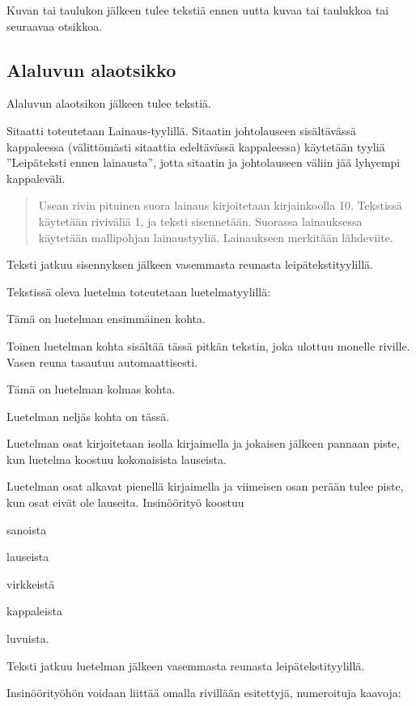 Kuvan tai taulukon jälkeen tulee tekstiä ennen uutta kuvaa tai taulukkoa tai seuraavaa otsikkoa.

\subsection{Alaluvun alaotsikko}

Alaluvun alaotsikon jälkeen tulee tekstiä.

Sitaatti toteutetaan Lainaus-tyylillä. Sitaatin johtolauseen sisältävässä kappaleessa (välittömästi sitaattia edeltävässä kappaleessa) käytetään tyyliä ”Leipäteksti ennen lainausta”, jotta sitaatin ja johtolauseen väliin jää lyhyempi kappaleväli.

\begin{quote}
Usean rivin pituinen suora lainaus kirjoitetaan kirjainkoolla 10. Tekstissä käytetään riviväliä 1, ja teksti sisennetään. Suorassa lainauksessa käytetään mallipohjan lainaustyyliä. Lainaukseen merkitään lähdeviite.
\end{quote}

Teksti jatkuu sisennyksen jälkeen vasemmasta reunasta leipätekstityylillä.

Tekstissä oleva luetelma toteutetaan luetelmatyylillä:

\begin{myitemize}
  \item \hspace{0.5cm} Tämä on luetelman ensimmäinen kohta.
  \item \hspace{0.5cm} Toinen luetelman kohta sisältää tässä pitkän tekstin, joka ulottuu monelle riville. Vasen reuna tasautuu automaattisesti.
  \item \hspace{0.5cm} Tämä on luetelman kolmas kohta.
  \item \hspace{0.5cm} Luetelman neljäs kohta on tässä.
\end{myitemize}

Luetelman osat kirjoitetaan isolla kirjaimella ja jokaisen jälkeen pannaan piste, kun luetelma koostuu kokonaisista lauseista.

Luetelman osat alkavat pienellä kirjaimella ja viimeisen osan perään tulee piste, kun osat eivät ole lauseita. Insinöörityö koostuu

\begin{myitemize}
  \item \hspace{0.5cm} sanoista
  \item \hspace{0.5cm} lauseista
  \item \hspace{0.5cm} virkkeistä
  \item \hspace{0.5cm} kappaleista
  \item \hspace{0.5cm} luvuista.
\end{myitemize}

Teksti jatkuu luetelman jälkeen vasemmasta reunasta leipätekstityylillä.

Insinöörityöhön voidaan liittää omalla rivillään esitettyjä, numeroituja kaavoja: